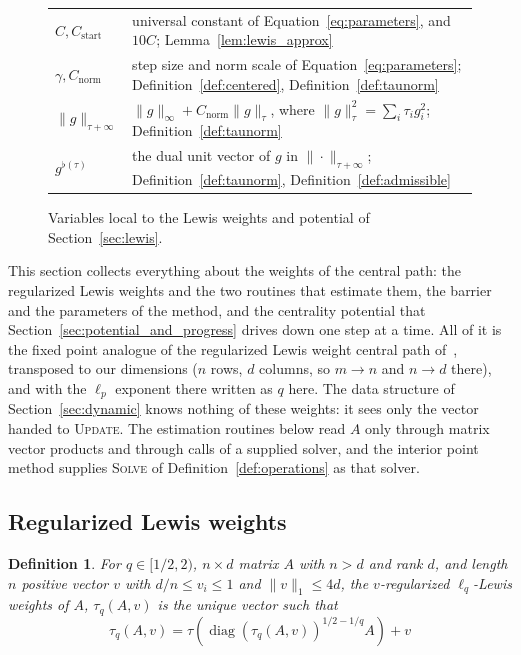 \documentclass[11pt]{article}
\newtheorem{definition}{Definition}[section]
\newcommand{\diag}{\operatorname{diag}}
\newcommand{\Cnorm}{C_{\mathrm{norm}}}
\begin{document}
\begin{figure}[H]
\begin{center}
\begin{tabular}{@{}lp{}@{}}
$C,C_{\mathrm{start}}$ & universal constant of Equation~\eqref{eq:parameters}, and $10C$; Lemma~\ref{lem:lewis_approx} \\
$\gamma,\Cnorm$ & step size and norm scale of Equation~\eqref{eq:parameters}; Definition~\ref{def:centered}, Definition~\ref{def:taunorm} \\
$\|g\|_{\tau+\infty}$ & $\|g\|_\infty + \Cnorm\|g\|_\tau$, where $\|g\|_\tau^2 = \sum_i\tau_ig_i^2$; Definition~\ref{def:taunorm} \\
$g^{\flat(\tau)}$ & the dual unit vector of $g$ in $\|\cdot\|_{\tau+\infty}$; Definition~\ref{def:taunorm}, Definition~\ref{def:admissible} \\
\bottomrule
\end{tabular}
\end{center}
\caption{Variables local to the Lewis weights and potential of
Section~\ref{sec:lewis}.}
\label{fig:notation_lewis}
\end{figure}

This section collects everything about the weights of the central path: the
regularized Lewis weights and the two routines that estimate them, the barrier
and the parameters of the method, and the centrality potential that
Section~\ref{sec:potential_and_progress} drives down one step at a time.
All of it is the fixed point analogue of the regularized Lewis weight central
path of~\cite{BLLSSSW21}, transposed to our
dimensions ($n$ rows,
$d$ columns, so
$m \rightarrow n$ and
$n \rightarrow d$ there), and with the
$\ell_{p}$ exponent there written as
$q$ here.
The data structure of Section~\ref{sec:dynamic} knows nothing of these weights:
it sees only the vector handed to \textsc{Update}.
The estimation routines below read $A$ only through matrix vector products and
through calls of a supplied solver, and the interior point method supplies
\textsc{Solve} of Definition~\ref{def:operations} as that solver.

\subsection{Regularized Lewis weights}
\label{subsec:weights}

\begin{definition}
For $q\in[1/2,2)$,
$n \times d$ matrix
$A$ with
$n > d$ and rank
$d$, and length
$n$ positive vector
$v$ with
$d/n \le v_i \le 1$ and
$\|v\|_1\le4d$, the
$v$-regularized
$\ell_{q}$-Lewis weights of
$A$,
$\tau_{q}(A, v)$ is the unique vector such that
\[
\tau_{q}(A, v)
=
\tau\left(\diag\left(\tau_{q}(A, v)\right)^{1/2-1/q}A\right) + v
\]
\end{definition}
\end{document}
